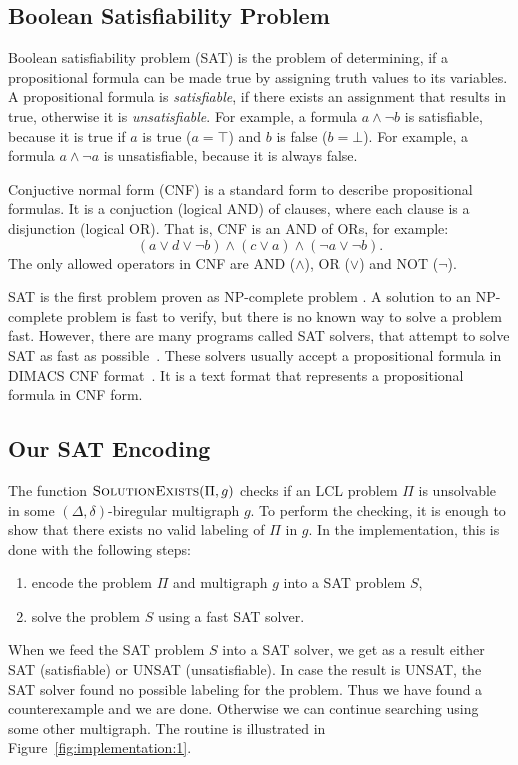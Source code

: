 \subsection{Boolean Satisfiability Problem} \label{sec:implementation:sat}

Boolean satisfiability problem (SAT) is the problem of determining, if a propositional formula can be made true by assigning truth values to its variables.
A propositional formula is \emph{satisfiable}, if there exists an assignment that results in true, otherwise it is \emph{unsatisfiable}.
For example, a formula $a \land \neg b$ is satisfiable, because it is true if $a$ is true ($a=\top$) and $b$ is false ($b=\bot$).
For example, a formula $a \land \neg a$ is unsatisfiable, because it is always false.

Conjuctive normal form (CNF) is a standard form to describe propositional formulas.
It is a conjuction (logical AND) of clauses, where each clause is a disjunction (logical OR).
That is, CNF is an AND of ORs, for example:
$$(a \lor d \lor \neg b)\land (c \lor a) \land (\neg a \lor  \neg b).$$
The only allowed operators in CNF are AND ($\land$), OR ($\lor$) and NOT ($\neg$).

SAT is the first problem proven as NP-complete problem \cite{DBLP:conf/stoc/Cook71}.
A solution to an NP-complete problem is fast to verify, but there is no known way to solve a problem fast.
However, there are many programs called SAT solvers, that attempt to solve SAT as fast as possible~\cite{TheInternationalSATCompetitionWebPage}.
These solvers usually accept a propositional formula in DIMACS CNF format~\cite{DIMACS:CNF}.
It is a text format that represents a propositional formula in CNF form.

\subsection{Our SAT Encoding} \label{sec:implementation:our_sat}


The function $\textsc{SolutionExists}(\Pi, g)$ checks if an LCL problem $\Pi$ is unsolvable in some $(\Delta, \delta)$-biregular multigraph $g$.
To perform the checking, it is enough to show that there exists no valid labeling of $\Pi$ in $g$.
In the implementation, this is done with the following steps:
\begin{enumerate}
    \item encode the problem $\Pi$ and multigraph $g$ into a SAT problem $S$,
    \item solve the problem $S$ using a fast SAT solver.
\end{enumerate}
When we feed the SAT problem $S$ into a SAT solver, we get as a result either SAT (satisfiable) or UNSAT (unsatisfiable).
In case the result is UNSAT, the SAT solver found no possible labeling for the problem.
Thus we have found a counterexample and we are done.
Otherwise we can continue searching using some other multigraph.
The routine is illustrated in Figure~\ref{fig:implementation:1}.

